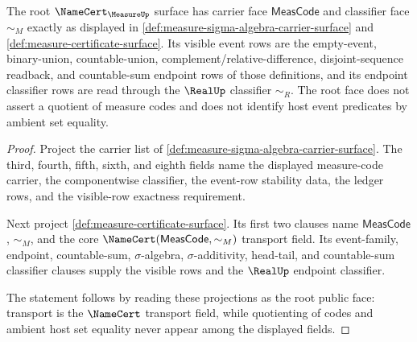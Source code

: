 \begin{theorem}
\label{thm:measure-root-namecert-carrier-classifier}
The root $\NameCert_{\MeasureUp}$ surface has carrier face
$\mathsf{MeasCode}$ and classifier face $\sim_M$ exactly as displayed in
\autoref{def:measure-sigma-algebra-carrier-surface} and
\autoref{def:measure-certificate-surface}. Its visible event rows are the
empty-event, binary-union, countable-union, complement/relative-difference,
disjoint-sequence readback, and countable-sum endpoint rows of those
definitions, and its endpoint classifier rows are read through the
$\RealUp$ classifier $\sim_R$. The root face does not assert a quotient of
measure codes and does not identify host event predicates by ambient set
equality.
\end{theorem}
\begin{proof}
Project the carrier list of
\autoref{def:measure-sigma-algebra-carrier-surface}. The third, fourth, fifth,
sixth, and eighth fields name the displayed measure-code carrier, the
componentwise classifier, the event-row stability data, the ledger rows, and
the visible-row exactness requirement.

Next project \autoref{def:measure-certificate-surface}. Its first two clauses
name $\mathsf{MeasCode}$, $\sim_M$, and the core
$\NameCert(\mathsf{MeasCode},\sim_M)$ transport field. Its event-family,
endpoint, countable-sum, $\sigma$-algebra, $\sigma$-additivity, head-tail, and
countable-sum classifier clauses supply the visible rows and the $\RealUp$
endpoint classifier.

The statement follows by reading these projections as the root public face:
transport is the $\NameCert$ transport field, while quotienting of codes and
ambient host set equality never appear among the displayed fields.
\end{proof}


